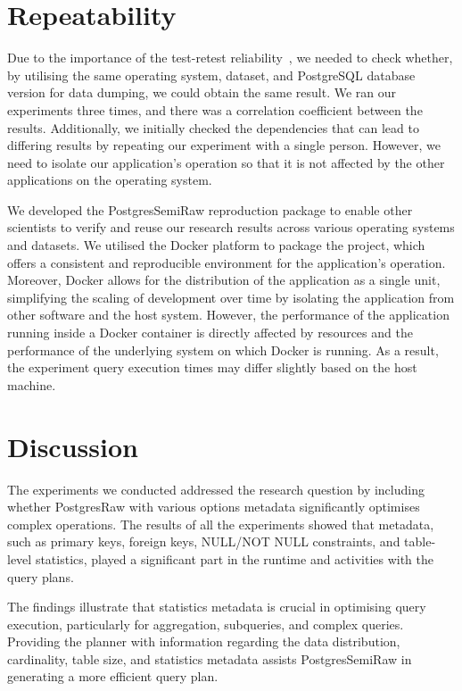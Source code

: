\section{Repeatability}
\label{sec:eval-repeatability}
Due to the importance of the test-retest reliability~\cite{trochim_types_2025}, we needed to check whether, by utilising the same operating system, dataset, and PostgreSQL database version for data dumping, we could obtain the same result. We ran our experiments three times, and there was a correlation coefficient between the results. Additionally, we initially checked the dependencies that can lead to differing results by repeating our experiment with a single person. However, we need to isolate our application's operation so that it is not affected by the other applications on the operating system.

We developed the PostgresSemiRaw reproduction package to enable other scientists to verify and reuse our research results across various operating systems and datasets. We utilised the Docker platform to package the project, which offers a consistent and reproducible environment for the application's operation. Moreover, Docker allows for the distribution of the application as a single unit, simplifying the scaling of development over time by isolating the application from other software and the host system. However, the performance of the application running inside a Docker container is directly affected by resources and the performance of the underlying system on which Docker is running. As a result, the experiment query execution times may differ slightly based on the host machine.

\section{Discussion}
\label{sec:eval-discussion}
The experiments we conducted addressed the research question by including whether PostgresRaw with various options metadata significantly optimises complex operations. The results of all the experiments showed that metadata, such as primary keys, foreign keys, NULL/NOT NULL constraints, and table-level statistics, played a significant part in the runtime and activities with the query plans.

The findings illustrate that statistics metadata is crucial in optimising query
execution, particularly for aggregation, subqueries, and complex queries. Providing the
planner with information regarding the data distribution, cardinality, table size, and statistics metadata assists PostgresSemiRaw in generating a more efficient query plan.

